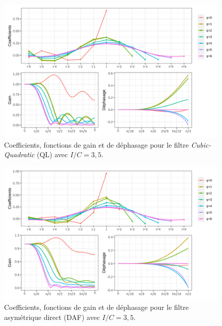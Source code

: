 \documentclass[
  12pt,
  a4paper,french]{article}
\newcommand\1{\mathds{1}}
\begin{document}
\begin{figure}[H]

{\centering \includegraphics[width=1\linewidth]{img/filters_used/cq} 

}

\caption[Coefficients, fonctions de gain et de déphasage pour le filtre \emph{Cubic-Quadratic} (QL) avec \(I/C=3,5\)]{Coefficients, fonctions de gain et de déphasage pour le filtre \emph{Cubic-Quadratic} (QL) avec \(I/C=3,5\).}\label{fig:graphscq}

\footnotesize
\normalsize\end{figure}

\begin{figure}[H]

{\centering \includegraphics[width=1\linewidth]{img/filters_used/daf} 

}

\caption[Coefficients, fonctions de gain et de déphasage pour le filtre asymétrique direct (DAF) avec \(I/C=3,5\)]{Coefficients, fonctions de gain et de déphasage pour le filtre asymétrique direct (DAF) avec \(I/C=3,5\).}\label{fig:graphsdaf}

\footnotesize
\normalsize\end{figure}
\end{document}
